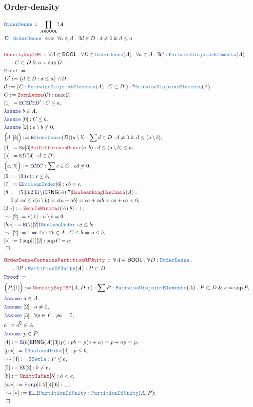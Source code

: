 \documentclass[12pt]{scrartcl}
\newcommand{\TYPE}[1]{\textcolor{NavyBlue}{\mathtt{#1}}}
\newcommand{\LOGIC}[1]{\textcolor{Blue}{\mathtt{#1}}}
\newcommand{\THM}[1]{\textcolor{Maroon}{\mathtt{#1}}}
\renewcommand{\.}{\; . \;}
\newcommand{\de}{: \kern 0.1pc =}
\newcommand{\Theorem}[2]{& \THM{#1} \, :: \, #2 \\ & \Proof = \\ }
\newcommand{\DeclareType}[2]{& \TYPE{#1} \, :: \, #2 \\}
\newcommand{\DefineType}[3]{& #1 : \TYPE{#2} \iff #3 \\}
\newcommand{\NewLine}{\\ & \kern 1pc}
\newcommand{\Page}[1]{ \begin{align*} #1 \end{align*}   }
\renewcommand{\And}{\; \& \;}
\newcommand{\Imply}{\Rightarrow}
\newcommand{\Intro}{\LOGIC{I}}
\newcommand{\Elim}{\LOGIC{E}}
\renewcommand{\c}{\complement}
\newcommand{\Say}[3]{& #1 \de #2 : #3, \\}
\newcommand{\SayIn}[3]{& #1 \de #2 \in #3, \\}
\newcommand{\Conclude}[3]{& #1 \de #2 : #3; \\}
\newcommand{\Derive}[3]{& \leadsto #1 \de #2 : #3, \\}
\newcommand{\DeriveConclude}[3]{& \leadsto #1 \de #2 : #3 ; \\}
\newcommand{\Assume}[2]{& \LOGIC{Assume} \; #1 : #2, \\}
\newcommand{\AssumeIn}[2]{& \LOGIC{Assume} \; #1 \in #2, \\}
\newcommand{\QED}{\; \square}
\newcommand{\EndProof}{& \QED \\}
\newcommand{\Proof}{\LOGIC{Proof} \; }
\newcommand{\C}{\mathcal{C}}
\newcommand{\RNG}{\mathsf{RNG}}
\newcommand{\PD}{\TYPE{PairwiseDisjointElements}}
\newcommand{\PoU}{\TYPE{PartitionOfUnity}}
\newcommand{\OD}{\TYPE{OrderDense}}
\newcommand{\BOOL}{\mathsf{BOOL}}
\begin{document}
\subsubsection{Order-density}
\Page{
	\DeclareType{OrderDense}
	{
		\prod_{A \in \BOOL} ?A
	}
	\DefineType{D}{OrderDense}{\forall a \in A \. \exists d \in D : d \neq 0 \And d \le a}
	\\
	\Theorem{DensitySupTHM}
	{
		\forall A \in \BOOL \.
		\forall D \in \TYPE{OrderDense}(A) \.
		\forall a \in A \.
		\exists C : \TYPE{PairwiseDisjointElements}(A) \.
		\NewLine \.
		C \subset D \And a = \sup D
	}
	\Say{D'}{\{d \in D : d \le a  \}}{?D}
	\Say{\C}{\{ C : \TYPE{PairwiseDisjointElements}(A) : C \subset D'   \}}{?\TYPE{PairwiseDisjointElements}(A)}
	\Say{C}{\THM{ZornLemma}(\C)}{\max \C }
	\Say{[1]}{\Elim C \Elim \C \Elim D'}{C \le a}
	\AssumeIn{b}{A}
	\Assume{[0]}{C \le b}
	\Assume{[2]}{a \setminus b \neq 0}
	\Say{\Big(d,[3]\Big)}{\Elim \TYPE{OrderDense}(D)(a \setminus b)}{\sum d \in D \. d \neq 0 \And d \le (a \setminus b) }
	\Say{[4]}{\Elim a [3]\THM{SetDifferenceOrder}(a,b)}{d \le (a \setminus b) \le a }
	\Say{[5]}{\Elim D' [4]}{d \in D'}
	\Say{\Big( c,[5]\Big)}{\Elim \C \Elim C }{ \sum c \in C \. cd \neq 0  }
	\Say{[6]}{[0](c) }{  c \le b  }
	\Say{[7]}{\Elim \TYPE{BooleanOrder}[6]}{cb = c}
	\Say{[8]}{[5][3.2]\Elim(\setminus) \Elim \RNG(A)[7]\THM{BooleanRingHasChar2}(A)}
	{
		\NewLine
		0 \neq 
		cd \le 
		c( a \setminus b) = 
		c( a  + ab   ) =
		ca + cab =
		ca + ca = 0
	}
	\Conclude{[2.*]}{ \THM{ZeroIsMinimal}(A)[8]}{\bot}
	\Derive{[2]}{\Elim(\bot)}{a \setminus b = 0}
	\Conclude{[b.*]}{\Elim(\setminus)[2]\Intro \TYPE{BooleanOrder}}{ a \le b}
	\Derive{[2]}{\Intro \Imply \Intro \forall}{ \forall b \in A \. C \le b \Imply a \le b}
	\Conclude{[*]}{\Intro \sup [1][2]}{\sup C = a }
	\EndProof
}\Page{
	\Theorem{OrderDenseContainsPartitionOfUnity}
	{
		\forall A \in \BOOL \.
		\forall D : \OD  \. \NewLine \.
		\exists P : \PoU(A) : P \subset D
	}
	\Say{\Big(P,[1] \Big)}{\THM{DensitySupTHM}(A,D,e)}{\sum  P: \PD(A) \. P \subset D \And e = \sup P}
	\AssumeIn{a}{A}
	\Assume{[2]}{a \neq 0}
	\Assume{[3]}{\forall p \in P \. pa = 0}
	\SayIn{b}{a^\c}{A}
	\AssumeIn{p}{P}
	\Say{[4]}{ \Elim(b) \Elim \RNG(A) [3](p) }
	{
		pb = 
		p(e + a) = 
		p + ap = 
		p
	}
	\Conclude{[p.*]}{ \Intro \TYPE{BooleanOrder}[4] }
	{
		p \le b
	}
	\Derive{[4]}{\Intro \TYPE{SetLe}}{P \le b}
	\Say{[5]}{\Elim b [2]}{b \neq e}
	\Say{[6]}{\THM{UnityIsMax}[5]}{ b < e }
	\Conclude{[a.*]}{\Elim \sup [1.2][4][6]}{\bot}
	\DeriveConclude{[*]}{\Elim \bot \Intro \PoU}{\PoU(A,P)}
	\EndProof
}
\newpage
\end{document}

